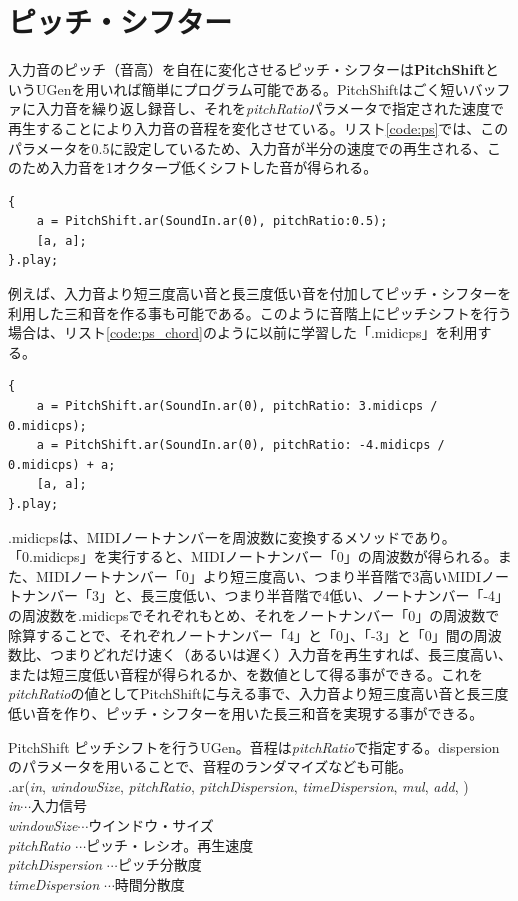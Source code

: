 \documentclass{jsarticle}
\begin{document}
\section{ピッチ・シフター}
入力音のピッチ（音高）を自在に変化させるピッチ・シフターは{\bf PitchShift}というUGenを用いれば簡単にプログラム可能である。PitchShiftはごく短いバッファに入力音を繰り返し録音し、それを{\it pitchRatio}パラメータで指定された速度で再生することにより入力音の音程を変化させている。リスト\ref{code:ps}では、このパラメータを0.5に設定しているため、入力音が半分の速度での再生される、このため入力音を1オクターブ低くシフトした音が得られる。

\begin{lstlisting}[caption=ピッチ・シフター, label=code:ps]
{
	a = PitchShift.ar(SoundIn.ar(0), pitchRatio:0.5);
	[a, a];
}.play;
\end{lstlisting}

例えば、入力音より短三度高い音と長三度低い音を付加してピッチ・シフターを利用した三和音を作る事も可能である。このように音階上にピッチシフトを行う場合は、リスト\ref{code:ps_chord}のように以前に学習した「.midicps」を利用する。

\begin{lstlisting}[caption=ピッチ・シフターによる和音, label=code:ps_chord]
{
	a = PitchShift.ar(SoundIn.ar(0), pitchRatio: 3.midicps / 0.midicps);
	a = PitchShift.ar(SoundIn.ar(0), pitchRatio: -4.midicps / 0.midicps) + a;
	[a, a];
}.play;
\end{lstlisting}

.midicpsは、MIDIノートナンバーを周波数に変換するメソッドであり。「0.midicps」を実行すると、MIDIノートナンバー「0」の周波数が得られる。また、MIDIノートナンバー「0」より短三度高い、つまり半音階で3高いMIDIノートナンバー「3」と、長三度低い、つまり半音階で4低い、ノートナンバー「-4」の周波数を.midicpsでそれぞれもとめ、それをノートナンバー「0」の周波数で除算することで、それぞれノートナンバー「4」と「0」、「-3」と「0」間の周波数比、つまりどれだけ速く（あるいは遅く）入力音を再生すれば、長三度高い、または短三度低い音程が得られるか、を数値として得る事ができる。これを{\it pitchRatio}の値としてPitchShiftに与える事で、入力音より短三度高い音と長三度低い音を作り、ピッチ・シフターを用いた長三和音を実現する事ができる。

\begin{itembox}[l]{PitchShift}
{\footnotesize 
ピッチシフトを行うUGen。音程は{\it pitchRatio}で指定する。dispersionのパラメータを用いることで、音程のランダマイズなども可能。\\
.ar({\it in}, {\it windowSize}, {\it pitchRatio}, {\it pitchDispersion}, {\it timeDispersion}, {\it mul}, {\it add}, )\\

{\it in}$\cdots$入力信号\\
{\it windowSize}$\cdots$ウインドウ・サイズ\\
{\it pitchRatio} $\cdots$ピッチ・レシオ。再生速度\\
{\it pitchDispersion} $\cdots$ピッチ分散度\\
{\it timeDispersion} $\cdots$時間分散度\\
}
\end{itembox}
\end{document}
